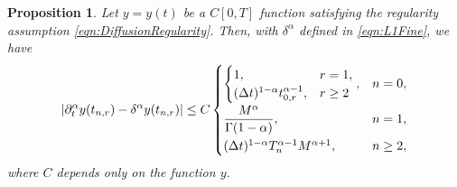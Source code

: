 \documentclass[12pt,a4paper]{article}
\newtheorem{prop}{Proposition}
\begin{document}
\begin{prop}\label{prop:L1Hybrid}
	Let $y = y(t)$ be a $C[0,T]$ function satisfying the regularity assumption \eqref{eqn:DiffusionRegularity}. Then, with $\delta^\alpha$ defined in \eqref{eqn:L1Fine}, we have
	\begin{equation}
		|\partial^\alpha_t y(t_{n,r}) - \delta^\alpha y(t_{n,r})| \leq C
		\begin{cases}
			\begin{cases} 1, & r = 1, \\ (\Delta t)^{1-\alpha} t_{0,r}^{\alpha-1}, & r\geq 2\end{cases}, & n = 0, \vspace{2pt}\\
			\dfrac{M^\alpha}{\Gamma(1-\alpha)}, & n = 1, \vspace{2pt}\\
			(\Delta t)^{1-\alpha} T_n^{\alpha-1} M^{\alpha+1}, & n \geq 2,
		\end{cases}
	\end{equation}
	where $C$ depends only on the function $y$.
\end{prop}
\end{document}
